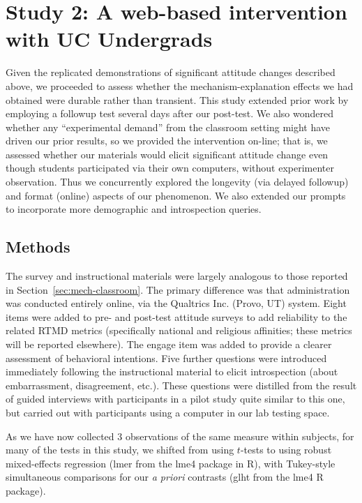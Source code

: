 \section{Study 2: A web-based intervention with UC Undergrads}

Given the replicated demonstrations of significant attitude changes described
above, we proceeded to assess whether the mechanism-explanation effects we had
obtained were durable rather than transient. This study extended prior work by
employing a followup test several days after our post-test. We also wondered
whether any ``experimental demand'' from the classroom setting might have driven
our prior results, so we provided the intervention on-line; that is, we assessed
whether our materials would elicit significant attitude change even though
students participated via their own computers, without experimenter observation.
Thus we concurrently explored the longevity (via delayed followup) and format
(online) aspects of our phenomenon. We also extended our prompts to incorporate
more demographic and introspection queries.

\subsection{Methods}
\label{sec:mech-online-methods}

The survey and instructional materials were largely analogous to those reported
in Section~\ref{sec:mech-classroom}. The primary difference was that
administration was conducted entirely online, via the Qualtrics Inc. (Provo, UT)
system. Eight items were added to pre- and post-test attitude surveys to add
reliability to the related RTMD metrics (specifically national and religious
affinities; these metrics will be reported elsewhere). The \textsf{engage} item
was added to provide a clearer assessment of behavioral intentions. Five further
questions were introduced immediately following the instructional material to
elicit introspection (about embarrassment, disagreement, etc.). These questions
were distilled from the result of guided interviews with participants in a pilot
study quite similar to this one, but carried out with participants using a
computer in our lab testing space.

As we have now collected 3 observations of the same measure within subjects, for
many of the tests in this study, we shifted from using $t$-tests to using robust
mixed-effects regression (\textsf{lmer} from the \textsf{lme4} package in R),
with Tukey-style simultaneous comparisons for our \emph{a priori} contrasts
(\textsf{glht} from the \textsf{lme4} R package).

